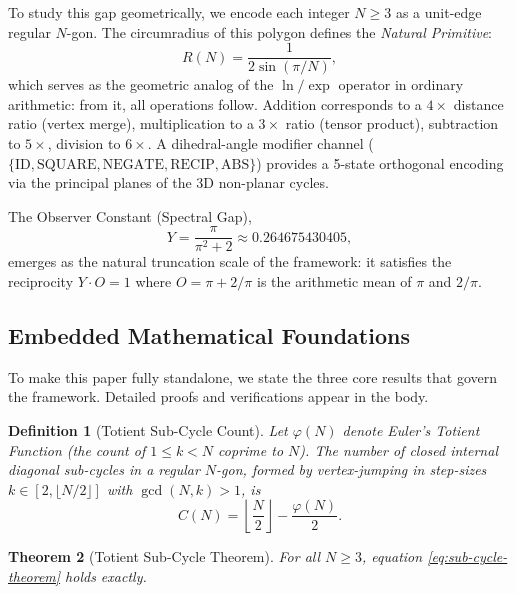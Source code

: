 \documentclass[11pt,a4paper]{article}
\newtheorem{theorem}{Theorem}
\newtheorem{definition}[theorem]{Definition}
\begin{document}
To study this gap geometrically, we encode each integer $N \geq 3$ as a
unit-edge regular $N$-gon. The circumradius of this polygon defines the
\emph{Natural Primitive}:
\begin{equation}
R(N) = \frac{1}{2\sin(\pi/N)},
\label{eq:natural-primitive}
\end{equation}
which serves as the geometric analog of the $\ln/\exp$ operator in
ordinary arithmetic: from it, all operations follow. Addition corresponds
to a $4\times$ distance ratio (vertex merge), multiplication to a
$3\times$ ratio (tensor product), subtraction to $5\times$, division to
$6\times$. A dihedral-angle modifier channel
($\{\mathrm{ID}, \mathrm{SQUARE}, \mathrm{NEGATE}, \mathrm{RECIP},
\mathrm{ABS}\}$) provides a 5-state orthogonal encoding via the principal
planes of the 3D non-planar cycles.

The Observer Constant (Spectral Gap),
\begin{equation}
Y = \frac{\pi}{\pi^2 + 2} \approx 0.264675430405,
\label{eq:observer-constant}
\end{equation}
emerges as the natural truncation scale of the framework: it satisfies
the reciprocity $Y \cdot O = 1$ where $O = \pi + 2/\pi$ is the
arithmetic mean of $\pi$ and $2/\pi$.

\subsection{Embedded Mathematical Foundations}

To make this paper fully standalone, we state the three core results
that govern the framework. Detailed proofs and verifications appear in
the body.

\begin{definition}[Totient Sub-Cycle Count]
Let $\varphi(N)$ denote Euler's Totient Function (the count of
$1 \leq k < N$ coprime to $N$). The number of closed internal diagonal
sub-cycles in a regular $N$-gon, formed by vertex-jumping in step-sizes
$k \in [2, \lfloor N/2 \rfloor]$ with $\gcd(N, k) > 1$, is
\begin{equation}
C(N) = \left\lfloor \frac{N}{2} \right\rfloor - \frac{\varphi(N)}{2}.
\label{eq:sub-cycle-theorem}
\end{equation}
\end{definition}

\begin{theorem}[Totient Sub-Cycle Theorem]
For all $N \geq 3$, equation \eqref{eq:sub-cycle-theorem} holds exactly.
\end{theorem}
\end{document}
